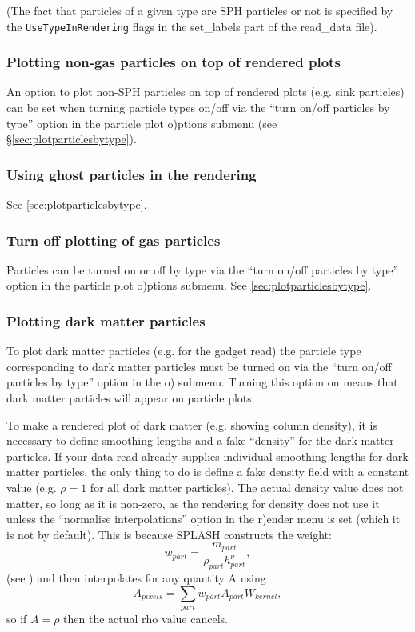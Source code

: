 \documentclass[a4paper,10pt]{article}
\begin{document}
 (The fact that particles of a given type are SPH particles or not is specified by the \verb+UseTypeInRendering+
flags in the set\_labels part of the read\_data file).

\subsubsection{ Plotting non-gas particles on top of rendered plots}
 An option to plot non-SPH particles on top of rendered plots (e.g. sink particles) can be set when turning particle types on/off via the ``turn on/off particles by type'' option in the particle plot o)ptions submenu (see \S\ref{sec:plotparticlesbytype}).

\subsubsection{ Using ghost particles in the rendering}
 See \ref{sec:plotparticlesbytype}.

\subsubsection{ Turn off plotting of gas particles}
 Particles can be turned on or off by type via the ``turn on/off particles by type'' option in the particle plot o)ptions submenu. See \ref{sec:plotparticlesbytype}. 

\subsubsection{ Plotting dark matter particles}
\label{sec:darkmatter}
 To plot dark matter particles (e.g. for the gadget read) the particle type corresponding to dark matter particles must be turned on via the ``turn on/off particles by type'' option in the o) submenu. Turning this option on means that dark matter particles will appear on particle plots.
 
  To make a rendered plot of dark matter (e.g. showing column density), it is necessary to define smoothing lengths and a fake ``density'' for the dark matter particles. If your data read already supplies individual smoothing lengths for dark matter particles, the only thing to do is define a fake density field with a constant value (e.g. $\rho = 1$ for all dark matter particles). The actual density value does not matter, so long as it is non-zero, as the rendering for density does not use it unless the ``normalise interpolations'' option in the r)ender menu is set (which it is not by default). This is because SPLASH constructs the weight:
\begin{equation}
w_{part} = \frac{m_{part}}{\rho_{part} h_{part}^{\nu}},
\end{equation}
(see \citealt{splashpaper}) and then interpolates for any quantity A using
\begin{equation}
A_{pixels} = \sum_{part} w_{part} A_{part} W_{kernel},
\end{equation}
so if $A = \rho$ then the actual rho value cancels. 
 
\end{document}
